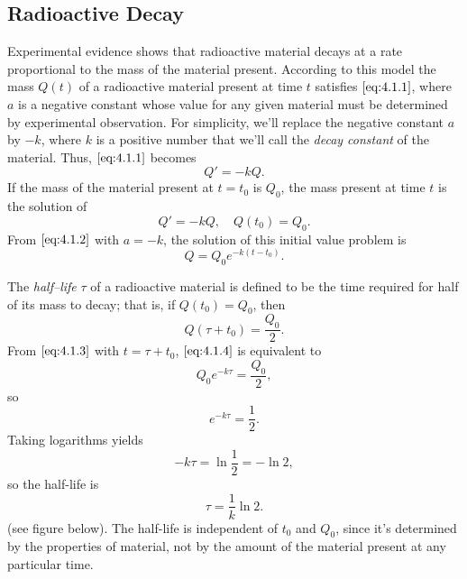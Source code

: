 \documentclass{ximera}
\begin{document}
\subsection*{Radioactive Decay}

Experimental evidence shows that radioactive material decays at a rate
proportional to the mass of the material present. According to this
model the mass $Q(t)$ of a radioactive material present at time $t$
satisfies $\eqref{eq:4.1.1}$, where $a$ is a negative constant whose value
for any given material must be determined by experimental observation.
For simplicity, we'll replace the negative constant $a$ by
$-k$, where
$k$ is a positive number that we'll call the \textit{decay constant}
of the material. Thus, $\eqref{eq:4.1.1}$ becomes
$$
Q'=-kQ.
$$
If the mass of the material present
at $t=t_0$ is $Q_0$,  the mass present at time $t$ is
 the solution of
$$
Q'=-kQ,\quad  Q(t_0)=Q_0.
$$
From $\eqref{eq:4.1.2}$  with $a=-k$, the solution of this initial value
problem is
\begin{equation} \label{eq:4.1.3}
Q=Q_0e^{-k(t-t_0)}.
\end{equation}

The \textit{half--life} $\tau$ of a radioactive material is defined to be
the time required for half of its mass to decay; that is, if
$Q(t_0)=Q_0$, then \begin{equation} \label{eq:4.1.4} Q(\tau+t_0)=\frac{Q_0}{2}.
\end{equation}
 From $\eqref{eq:4.1.3}$ with $t=\tau+t_0$, $\eqref{eq:4.1.4}$ is equivalent to
$$
Q_0e^{-k\tau}=\frac{Q_0}{2},
$$
 so
$$
e^{-k\tau}=\frac{1}{2}.
$$
 Taking logarithms  yields
$$
-k\tau=\ln\frac{1}{2}=-\ln2,
$$
 so the half-life is
\begin{equation} \label{eq:4.1.5}
\tau=\frac{1}{k}\ln2.
\end{equation}
(see figure below).
The half-life is independent of $t_0$ and
$Q_0$, since it's determined by the properties of material, not by
the amount of the material present at any particular time.

\begin{center}
\end{center}


\end{document}
